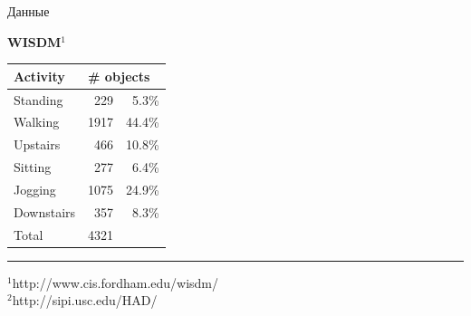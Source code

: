 \documentclass{beamer}
\begin{document}
\begin{frame}{Данные}
\noindent
\begin{minipage}[t]{0.45\linewidth}
	\textbf{WISDM}$^1$
	\begin{table}[]
		\scriptsize
		\label{my-label}
		\begin{tabular}{l|rr}
			\hline
			\textbf{Activity}   & \multicolumn{2}{l}{\textbf{\# objects}} \\
			\hline
			Standing   & 229 & 5.3\% \\
			Walking    & 1917 & 44.4\%\\
			Upstairs   & 466 &10.8\%\\
			Sitting    & 277  &6.4\%\\
			Jogging    & 1075 &24.9\%\\
			Downstairs & 357 &8.3\%\\
			\hline
			Total & \multicolumn{2}{l}{4321}  \\
			\hline
		\end{tabular}
	\end{table}

	\vspace{1cm}
	\medskip\hrule\medskip
	{\scriptsize $^1$http://www.cis.fordham.edu/wisdm/ \\
		$^2$http://sipi.usc.edu/HAD/}
	

\end{minipage}
\end{frame}
\end{document}
